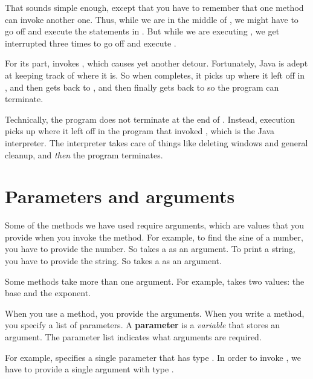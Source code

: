That sounds simple enough, except that you have to remember that one method can invoke another one.
Thus, while we are in the middle of , we might have to go off and execute the statements in .
But while we are executing , we get interrupted three times to go off and execute .

For its part,  invokes , which causes yet another detour.
Fortunately, Java is adept at keeping track of where it is.
So when  completes, it picks up where it left off in , and then gets back to , and then finally gets back to  so the program can terminate.

Technically, the program does not terminate at the end of .
Instead, execution picks up where it left off in the program that invoked , which is the Java interpreter.
The interpreter takes care of things like deleting windows and general cleanup, and {\em then} the program terminates.



\section{Parameters and arguments}


Some of the methods we have used require arguments, which are values that you provide when you invoke the method.
For example, to find the sine of a number, you have to provide the number.
So  takes a  as an argument.
To print a string, you have to provide the string.
So  takes a  as an argument.

Some methods take more than one argument.
For example,  takes two  values: the base and the exponent.

When you use a method, you provide the arguments.
When you write a method, you specify a list of parameters.
A {\bf parameter} is a {\em variable} that stores an argument.
The parameter list indicates what arguments are required.

For example,  specifies a single parameter  that has type .
In order to invoke , we have to provide a single argument with type .

